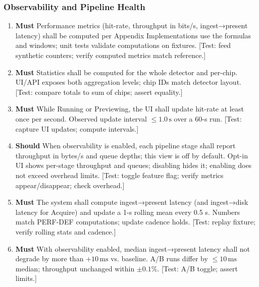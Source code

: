 \documentclass[10pt]{article}
\newcommand{\PriorityTag}[2]{%
  \colorbox{#2!25}{\footnotesize\textsf{\textbf{#1}}}\hspace{0.6em}}
\newcommand{\must}{\leavevmode\PriorityTag{Must}{green}}
\newcommand{\should}{\leavevmode\PriorityTag{Should}{yellow}}
\newcounter{reqgrp}[section] %
\newcounter{reqno}
\newcommand{\reqprefix}{GEN}
\newenvironment{requirements}[1]{%
  \renewcommand{\reqprefix}{#1}%
  \refstepcounter{reqgrp}%
  \setcounter{reqno}{0}%
  \begin{enumerate}[leftmargin=*]
}{\end{enumerate}}
\begin{document}
\subsubsection{Observability and Pipeline Health}
\begin{requirements}{OBS}

\item \must {}
  {Performance metrics (hit-rate, throughput in bits/s, ingest→present latency) shall be computed per Appendix }
  {Implementations use the formulas and windows; unit tests validate computations on fixtures.}
  [Test: feed synthetic counters; verify computed metrics match reference.]

\item \must {}
  {Statistics shall be computed for the whole detector and per-chip.}
  {UI/API exposes both aggregation levels; chip IDs match detector layout.}
  [Test: compare totals to sum of chips; assert equality.]

\item \must {}
  {While Running or Previewing, the UI shall update hit-rate at least once per second.}
  {Observed update interval \(\le 1.0\,\mathrm{s}\) over a 60-s run.}
  [Test: capture UI updates; compute intervals.]

\item \should {}
  {When observability is enabled, each pipeline stage shall report throughput in bytes/s and queue depths; this view is off by default.}
  {Opt-in UI shows per-stage throughput and queues; disabling hides it; enabling does not exceed overhead limits.}
  [Test: toggle feature flag; verify metrics appear/disappear; check overhead.]

\item \must {}
  {The system shall compute ingest→present latency (and ingest→disk latency for Acquire) and update a 1-s rolling mean every 0.5 s.}
  {Numbers match PERF-DEF computations; update cadence holds.}
  [Test: replay fixture; verify rolling stats and cadence.]

\item \must {}
  {With observability enabled, median ingest→present latency shall not degrade by more than \(+10\,\mathrm{ms}\) vs. baseline.}
  {A/B runs differ by \(\le 10\,\mathrm{ms}\) median; throughput unchanged within \(\pm 0.1\%\).}
  [Test: A/B toggle; assert limits.]


\end{requirements}
\end{document}
